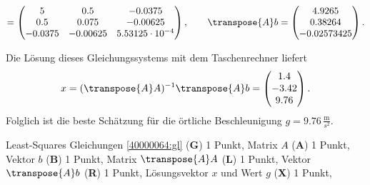 \begin{loesung}
\begin{teilaufgaben}
\[=
\begin{pmatrix}
5 & 0.5 & -0.0375\\
0.5 & 0.075 & -0.00625\\
-0.0375 & -0.00625 & 5.53125\cdot 10^{-4}
\end{pmatrix},
\qquad
\transpose{A}b
=
\begin{pmatrix}
4.9265\\
0.38264\\
-0.02573425
\end{pmatrix}.
\]
\item
Die Lösung dieses Gleichungssystems mit dem Taschenrechner liefert
\[
  x = (\transpose{A}A)^{-1}\transpose{A}b = 
  \begin{pmatrix}
    1.4\\
    -3.42\\
   9.76 
  \end{pmatrix}.
\]
Folglich ist die beste Schätzung für die
örtliche Beschleunigung $g = 9.76\,\frac{\text{m}}{s^2}$.
\end{teilaufgaben}
\end{loesung}

\begin{bewertung}
Least-Squares Gleichungen \eqref{40000064:gl} ({\bf G}) 1 Punkt,
Matrix $A$ ({\bf A}) 1 Punkt,
Vektor $b$ ({\bf B}) 1 Punkt,
Matrix $\transpose{A}A$ ({\bf L}) 1 Punkt,
Vektor $\transpose{A}b$ ({\bf R}) 1 Punkt,
Lösungsvektor $x$ und Wert $g$ ({\bf X}) 1 Punkt,
\end{bewertung}
